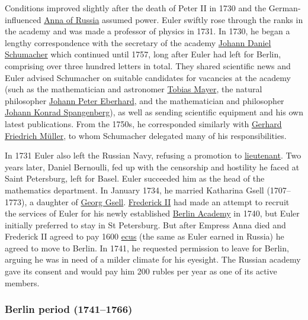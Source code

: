 Conditions improved slightly after the death of Peter II in 1730 and the German-influenced \href{https://en.wikipedia.org/wiki/Anna_of_Russia}{Anna of Russia} assumed power. Euler swiftly rose through the ranks in the academy and was made a professor of physics in 1731. In 1730, he began a lengthy correspondence with the secretary of the academy \href{https://en.wikipedia.org/wiki/Johann_Daniel_Schumacher}{Johann Daniel Schumacher} which continued until 1757, long after Euler had left for Berlin, comprising over three hundred letters in total. They shared scientific news and Euler advised Schumacher on suitable candidates for vacancies at the academy (such as the mathematician and astronomer \href{https://en.wikipedia.org/wiki/Tobias_Mayer}{Tobias Mayer}, the natural philosopher \href{https://en.wikipedia.org/wiki/Johann_Peter_Eberhard?action=edit&redlink=1}{Johann Peter Eberhard}, and the mathematician and philosopher \href{https://en.wikipedia.org/wiki/Johann_Konrad_Spangenberg?action=edit&redlink=1}{Johann Konrad Spangenberg}), as well as sending scientific equipment and his own latest publications. From the 1750s, he corresponded similarly with \href{https://en.wikipedia.org/wiki/Gerhard_Friedrich_Müller}{Gerhard Friedrich Müller}, to whom Schumacher delegated many of his responsibilities.

In 1731 Euler also left the Russian Navy, refusing a promotion to \href{https://en.wikipedia.org/wiki/Lieutenant_(navy)}{lieutenant}. Two years later, Daniel Bernoulli, fed up with the censorship and hostility he faced at Saint Petersburg, left for Basel. Euler succeeded him as the head of the mathematics department. In January 1734, he married Katharina Gsell (1707--1773), a daughter of \href{https://en.wikipedia.org/wiki/Georg_Gsell}{Georg Gsell}. \href{https://en.wikipedia.org/wiki/Frederick_the_Great}{Frederick II} had made an attempt to recruit the services of Euler for his newly established \href{https://en.wikipedia.org/wiki/Prussian_Academy_of_Sciences}{Berlin Academy} in 1740, but Euler initially preferred to stay in St Petersburg. But after Empress Anna died and Frederick II agreed to pay 1600 \href{https://en.wikipedia.org/wiki/Écu}{ecus} (the same as Euler earned in Russia) he agreed to move to Berlin. In 1741, he requested permission to leave for Berlin, arguing he was in need of a milder climate for his eyesight. The Russian academy gave its consent and would pay him 200 rubles per year as one of its active members.


\subsubsection[Berlin period (1741--1766)]{\texorpdfstring{\protect\hypertarget{Berlin_period_.281741.E2.80.931766.29}{}{}Berlin period (1741--1766)}{Berlin period (1741--1766)}}\label{Berlin_period_ux281741ux20131766ux29}

